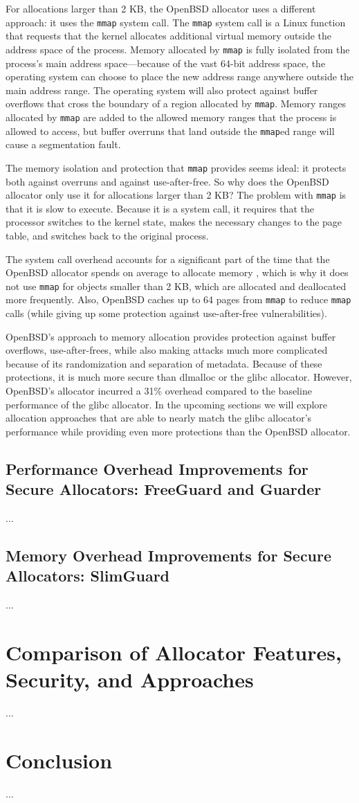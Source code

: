 \documentclass[conference]{IEEEtran}
\begin{document}
For allocations larger than 2 KB, the OpenBSD allocator uses a different approach: it uses the \verb|mmap| system call.
The \verb|mmap| system call is a Linux function that requests that the kernel allocates additional virtual memory outside the address space of the process. \cite{mmap_man_page}
Memory allocated by \verb|mmap| is fully isolated from the process's main address space---because of the vast 64-bit address space, the operating system can choose to place the new address range anywhere outside the main address range.
The operating system will also protect against buffer overflows that cross the boundary of a region allocated by \verb|mmap|.
Memory ranges allocated by \verb|mmap| are added to the allowed memory ranges that the process is allowed to access, but buffer overruns that land outside the \verb|mmap|ed range will cause a segmentation fault.

The memory isolation and protection that \verb|mmap| provides seems ideal: it protects both against overruns and against use-after-free.
So why does the OpenBSD allocator only use it for allocations larger than 2 KB?
The problem with \verb|mmap| is that it is slow to execute.
Because it is a system call, it requires that the processor switches to the kernel state, makes the necessary changes to the page table, and switches back to the original process.

The system call overhead accounts for a significant part of the time that the OpenBSD allocator spends on average to allocate memory \cite{guarder}, which is why it does not use \verb|mmap| for objects smaller than 2 KB, which are allocated and deallocated more frequently.
Also, OpenBSD caches up to 64 pages from \verb|mmap| \cite{freeguard} to reduce \verb|mmap| calls (while giving up some protection against use-after-free vulnerabilities).

OpenBSD's approach to memory allocation provides protection against buffer overflows, use-after-frees, while also making attacks much more complicated because of its randomization and separation of metadata.
Because of these protections, it is much more secure than dlmalloc or the glibc allocator.
However, OpenBSD's allocator incurred a 31\% overhead compared to the baseline performance of the glibc allocator.
In the upcoming sections we will explore allocation approaches that are able to nearly match the glibc allocator's performance while providing even more protections than the OpenBSD allocator.

\subsection{Performance Overhead Improvements for Secure Allocators: FreeGuard and Guarder}
{\color{red}...}

\subsection{Memory Overhead Improvements for Secure Allocators: SlimGuard}
{\color{red}...}

\section{Comparison of Allocator Features, Security, and Approaches}
 {\color{red}...}

\section{Conclusion}
 {\color{red}...}

\printbibliography
\end{document}
